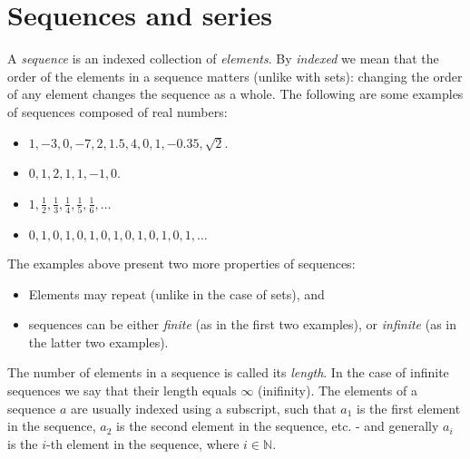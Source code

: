 \section{Sequences and series}
A \emph{sequence} is an indexed collection of \emph{elements}. By \textit{indexed} we mean that the order of the elements in a sequence matters (unlike with sets): changing the order of any element changes the sequence as a whole. The following are some examples of sequences composed of real numbers:
\begin{itemize}
	\item $1,-3,0,-7,2,1.5,4,0,1,-0.35,\sqrt{2}$.
	\item $0,1,2,1,1,-1,0$.
	\item $1, \frac{1}{2}, \frac{1}{3}, \frac{1}{4}, \frac{1}{5}, \frac{1}{6}, \dots$
	\item $0,1,0,1,0,1,0,1,0,1,0,1,0,1,\dots$
\end{itemize}
The examples above present two more properties of sequences:
\begin{itemize}
	\item Elements may repeat (unlike in the case of sets), and
	\item sequences can be either \emph{finite} (as in the first two examples), or \emph{infinite} (as in the latter two examples).
\end{itemize}

The number of elements in a sequence is called its \emph{length}. In the case of infinite sequences we say that their length equals $\infty$ (inifinity). The elements of a sequence $a$ are usually indexed using a subscript, such that $a_{1}$ is the first element in the sequence, $a_{2}$ is the second element in the sequence, etc. - and generally $a_{i}$ is the $i$-th element in the sequence, where $i\in\mathbb{N}$.

